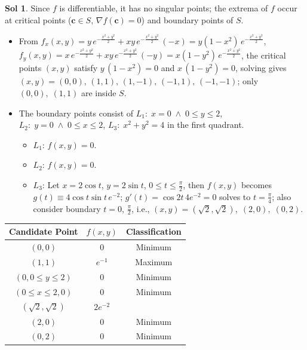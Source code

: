 \documentclass[12pt]{extarticle}
\newcommand{\ds}{\displaystyle}
\newcommand{\andd}{\;\wedge\;}
\theoremstyle{definition}
\newtheorem*{sol}{Sol}
\newcommand{\vc}{\mathbf{c}}
\begin{document}
\begin{sol}
  Since $f$ is differentiable, it has no singular points; the extrema of $f$ occur at critical points ($\vc\in S,\,\nabla f(\vc) = 0$) and boundary points of $S$. 
  \begin{itemize}\setlength\itemsep{0em}
    \item From $\ds f_x(x, y) = y\,e^{-\frac{x^2 + y^2}{2}} + xy\,e^{-\frac{x^2 + y^2}{2}}\,(-x) = y(1 - x^2)\,e^{-\frac{x^2 + y^2}{2}}$, $\ds f_y(x, y) = x\,e^{-\frac{x^2 + y^2}{2}} + xy\,e^{-\frac{x^2 + y^2}{2}}\,(-y) = x(1 - y^2)\,e^{-\frac{x^2 + y^2}{2}}$, the critical points $(x, y)$ satisfy $\ds y\,(1 - x^2) = 0$ and $x\,(1 - y^2) = 0$, solving gives $(x, y) = (0, 0),\,(1, 1),\,(1, -1),\,(-1, 1),\,(-1, -1)$; only $(0, 0),\;(1, 1)$ are inside $S$. 
    \item The boundary points consist of $L_1:\;x = 0\andd 0\leqslant y\leqslant 2$, $L_2:\;y = 0\andd 0\leqslant x\leqslant 2$, $L_3:\;x^2 + y^2 = 4$ in the first quadrant. 
      \begin{itemize}\setlength\itemsep{0em}
        \item $L_1$: $f(x, y) = 0$. 
        \item $L_2$: $f(x, y) = 0$. 
        \item $L_3$: Let $x = 2\cos t$, $y = 2\sin t$, $0\leqslant t\leqslant\frac{\pi}{2}$, then $f(x, y)$ becomes $\ds g(t)\equiv4\cos t\sin t\,e^{-2}$; $g'(t) = \cos 2t\,4e^{-2} = 0$ solves to $t = \frac{\pi}{4}$; also consider boundary $t = 0,\,\frac{\pi}{2}$, i.e., $(x, y) = (\sqrt{2}, \sqrt{2}),\;(2, 0),\;(0, 2)$.  
      \end{itemize}
  \end{itemize}
  \begin{center}
    \renewcommand{\arraystretch}{1.3}
    \begin{tabular}{ccc}
      \toprule
      Candidate Point  & $f(x,y)$ & Classification \\ 
      \midrule
      $(0, 0)$ & $0$ & Minimum \\ 
      $(1, 1)$ & $e^{-1}$ & Maximum \\ 
      $(0, 0\leqslant y\leqslant 2)$ & $0$ & Minimum \\
      $(0\leqslant x\leqslant 2, 0)$ & $0$ & Minimum \\
      $(\sqrt{2}, \sqrt{2})$ & $2e^{-2}$ & \\ 
      $(2, 0)$ & $0$ & Minimum \\ 
      $(0, 2)$ & $0$ & Minimum \\ 
      \bottomrule
    \end{tabular}
    \renewcommand{\arraystretch}{1.0}
  \end{center}
\end{sol}
\end{document}

